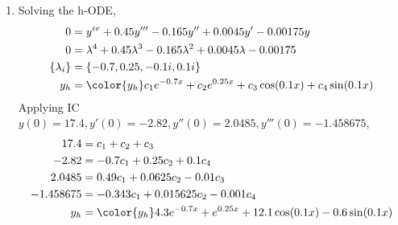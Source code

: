 \begin{enumerate}
    \item Solving the h-ODE,
          \begin{align}
              0               & = y^{iv} + 0.45y''' - 0.165y'' + 0.0045y' - 0.00175y \\
              0               & = \lambda^{4} + 0.45\lambda^{3} - 0.165\lambda^{2}
              + 0.0045\lambda - 0.00175                                              \\
              \{\lambda_{i}\} & = \{-0.7, 0.25, -0.1i, 0.1i\}                        \\
              y_{h}           & = \color{y_h} c_{1}e^{-0.7x} + c_{2}e^{0.25x}
              + c_{3}\cos(0.1x) + c_{4}\sin(0.1x)
          \end{align}
          Applying IC $ y(0) = 17.4, y'(0) = -2.82, y''(0) = 2.0485, y'''(0)
              = -1.458675 $,
          \begin{align}
              17.4      & = c_{1} + c_{2} + c_{3}                                 \\
              -2.82     & = -0.7c_{1} + 0.25c_{2} + 0.1c_{4}                      \\
              2.0485    & = 0.49c_{1} + 0.0625c_{2} - 0.01c_{3}                   \\
              -1.458675 & = -0.343c_{1} + 0.015625c_{2} - 0.001c_{4}              \\
              y_{h}     & = \color{y_h} 4.3e^{-0.7x} + e^{0.25x} + 12.1\cos(0.1x)
              - 0.6\sin(0.1x)
          \end{align}
          \begin{figure}[H]
              \centering
          \end{figure}


\end{enumerate}
